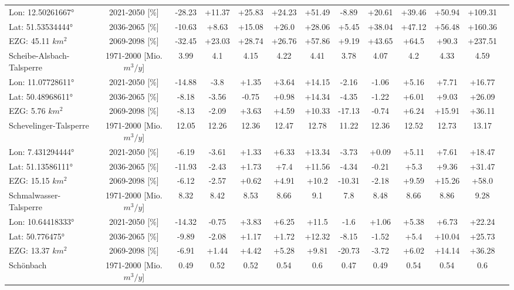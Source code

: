 \begin{longtable}{@{\extracolsep{\fill}}lc|ccccc||cccccc}
\cline{2-12} 
Lon: 12.50261667° & 2021-2050 [\%]  & -28.23 & +11.37 & +25.83 & +24.23 & +51.49 & -8.89 & +20.61 & +39.46 & +50.94 & +109.31\\ 
Lat: 51.53534444° & 2036-2065 [\%]  & -10.63 & +8.63 & +15.08 & +26.0 & +28.06 & +5.45 & +38.04 & +47.12 & +56.48 & +160.36\\ 
EZG: 45.11 $km^2$ & 2069-2098 [\%]  & -32.45 & +23.03 & +28.74 & +26.76 & +57.86 & +9.19 & +43.65 & +64.5 & +90.3 & +237.51\\ 
\hline 
Scheibe-Alsbach-Talsperre & 1971-2000 [Mio. $m^3/y$]  & 3.99 & 4.1 & 4.15 & 4.22 & 4.41 & 3.78 & 4.07 & 4.2 & 4.33 & 4.59\\ 
\cline{2-12} 
Lon: 11.07728611° & 2021-2050 [\%]  & -14.88 & -3.8 & +1.35 & +3.64 & +14.15 & -2.16 & -1.06 & +5.16 & +7.71 & +16.77\\ 
Lat: 50.48968611° & 2036-2065 [\%]  & -8.18 & -3.56 & -0.75 & +0.98 & +14.34 & -4.35 & -1.22 & +6.01 & +9.03 & +26.09\\ 
EZG: 5.76 $km^2$ & 2069-2098 [\%]  & -8.13 & -2.09 & +3.63 & +4.59 & +10.33 & -17.13 & -0.74 & +6.24 & +15.91 & +36.11\\ 
\hline 
Schevelinger-Talsperre & 1971-2000 [Mio. $m^3/y$]  & 12.05 & 12.26 & 12.36 & 12.47 & 12.78 & 11.22 & 12.36 & 12.52 & 12.73 & 13.17\\ 
\cline{2-12} 
Lon: 7.431294444° & 2021-2050 [\%]  & -6.19 & -3.61 & +1.33 & +6.33 & +13.34 & -3.73 & +0.09 & +5.11 & +7.61 & +18.47\\ 
Lat: 51.13586111° & 2036-2065 [\%]  & -11.93 & -2.43 & +1.73 & +7.4 & +11.56 & -4.34 & -0.21 & +5.3 & +9.36 & +31.47\\ 
EZG: 15.15 $km^2$ & 2069-2098 [\%]  & -6.12 & -2.57 & +0.62 & +4.91 & +10.2 & -10.31 & -2.18 & +9.59 & +15.26 & +58.0\\ 
\hline 
Schmalwasser-Talsperre & 1971-2000 [Mio. $m^3/y$]  & 8.32 & 8.42 & 8.53 & 8.66 & 9.1 & 7.8 & 8.48 & 8.66 & 8.86 & 9.28\\ 
\cline{2-12} 
Lon: 10.64418333° & 2021-2050 [\%]  & -14.32 & -0.75 & +3.83 & +6.25 & +11.5 & -1.6 & +1.06 & +5.38 & +6.73 & +22.24\\ 
Lat: 50.776475° & 2036-2065 [\%]  & -9.89 & -2.08 & +1.17 & +1.72 & +12.32 & -8.15 & -1.52 & +5.4 & +10.04 & +25.73\\ 
EZG: 13.37 $km^2$ & 2069-2098 [\%]  & -6.91 & +1.44 & +4.42 & +5.28 & +9.81 & -20.73 & -3.72 & +6.02 & +14.14 & +36.28\\ 
\hline 
Schönbach & 1971-2000 [Mio. $m^3/y$]  & 0.49 & 0.52 & 0.52 & 0.54 & 0.6 & 0.47 & 0.49 & 0.54 & 0.54 & 0.6\\ 

\end{longtable}
